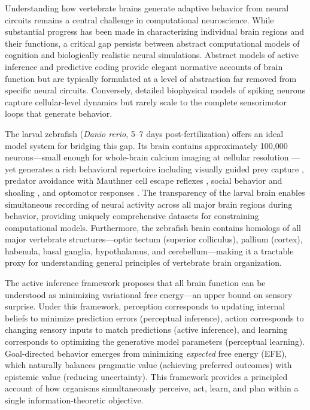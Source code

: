 \documentclass[12pt]{article}
\begin{document}
Understanding how vertebrate brains generate adaptive behavior from
neural circuits remains a central challenge in computational
neuroscience.
While substantial progress has been made in characterizing individual
brain regions and their functions, a critical gap persists between
abstract computational models of cognition and biologically realistic
neural simulations.
Abstract models of active inference \citep{friston2010,parr2022}
and predictive coding \citep{rao1999,bogacz2017} provide elegant
normative accounts of brain function but are typically formulated at
a level of abstraction far removed from specific neural circuits.
Conversely, detailed biophysical models of spiking neurons capture
cellular-level dynamics but rarely scale to the complete sensorimotor
loops that generate behavior.

The larval zebrafish (\textit{Danio rerio}, 5--7 days
post-fertilization) offers an ideal model system for bridging this
gap.
Its brain contains approximately 100,000 neurons---small enough for
whole-brain calcium imaging at cellular resolution
\citep{ahrens2013}---yet generates a rich behavioral repertoire
including visually guided prey capture \citep{bianco2015}, predator
avoidance with Mauthner cell escape reflexes \citep{temizer2015,dunn2016},
social behavior and shoaling \citep{dreosti2015}, and optomotor
responses \citep{portugues2014}.
The transparency of the larval brain enables simultaneous recording of
neural activity across all major brain regions during behavior, providing
uniquely comprehensive datasets for constraining computational models.
Furthermore, the zebrafish brain contains homologs of all major
vertebrate structures---optic tectum (superior colliculus), pallium
(cortex), habenula, basal ganglia, hypothalamus, and cerebellum---making
it a tractable proxy for understanding general principles of vertebrate
brain organization.

The active inference framework \citep{friston2010,friston2017,parr2022}
proposes that all brain function can be understood as minimizing
variational free energy---an upper bound on sensory surprise.
Under this framework, perception corresponds to updating internal
beliefs to minimize prediction errors (perceptual inference), action
corresponds to changing sensory inputs to match predictions (active
inference), and learning corresponds to optimizing the generative model
parameters (perceptual learning).
Goal-directed behavior emerges from minimizing \emph{expected} free
energy (EFE), which naturally balances pragmatic value (achieving
preferred outcomes) with epistemic value (reducing uncertainty).
This framework provides a principled account of how organisms
simultaneously perceive, act, learn, and plan within a single
information-theoretic objective.
\end{document}

